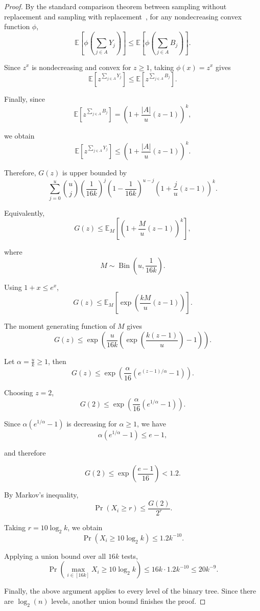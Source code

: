 \documentclass{article}
\begin{document}
\begin{proof}
By the standard comparison theorem between sampling without replacement and
sampling with replacement~\cite{hoeffding1963probability}, 
for any nondecreasing convex function $\phi$,
\[
\mathbb{E}\left[\phi\left(\sum_{j\in A}Y_j\right)\right]
\leq
\mathbb{E}\left[\phi\left(\sum_{j\in A}B_j\right)\right].
\]

Since $z^x$ is nondecreasing and convex for $z\geq 1$, taking
$\phi(x)=z^x$ gives
\[
\mathbb{E}
\left[
z^{\sum_{j\in A}Y_j}
\right]
\leq
\mathbb{E}
\left[
z^{\sum_{j\in A}B_j}
\right].
\]

Finally, since
\[
\mathbb{E}
\left[
z^{\sum_{j\in A}B_j}
\right]
=
\left(
1+\frac{|A|}{u}(z-1)
\right)^k, 
\]

we obtain
\[
\mathbb{E}
\left[
z^{\sum_{j\in A}Y_j}
\right]
\leq
\left(
1+\frac{|A|}{u}(z-1)
\right)^k .
\]

Therefore, $G(z)$ is upper bounded by
\[
\sum_{j=0}^{u}
{u\choose j}
\left(\frac1{16k}\right)^j
\left(1-\frac1{16k}\right)^{u-j}
\left(
1+\frac{j}{u}(z-1)
\right)^k .
\]

Equivalently,
\[
G(z)
\leq
\mathbb{E}_{M}
\left[
\left(
1+\frac{M}{u}(z-1)
\right)^k
\right],
\]

where
\[
M\sim
\operatorname{Bin}
\left(u,\frac1{16k}\right).
\]

Using $1+x\leq e^x$,
\[
G(z)
\leq
\mathbb{E}_{M}
\left[
\exp
\left(
\frac{kM}{u}(z-1)
\right)
\right].
\]

The moment generating function of $M$ gives
\[
G(z)
\leq
\exp
\left(
\frac{u}{16k}
\left(
\exp\left(\frac{k(z-1)}{u}\right)-1
\right)
\right).
\]

Let $\alpha=\frac{u}{k}\geq1$, then
\[
G(z)
\leq
\exp
\left(
\frac{\alpha}{16}
\left(
e^{(z-1)/\alpha}-1
\right)
\right).
\]

Choosing $z=2$,
\[
G(2)
\leq
\exp
\left(
\frac{\alpha}{16}(e^{1/\alpha}-1)
\right).
\]

Since $\alpha(e^{1/\alpha}-1)$ is decreasing for $\alpha\geq1$, we have 
\[
\alpha(e^{1/\alpha}-1)\leq e-1,
\]

and therefore

\[
G(2)
\leq
\exp\left(\frac{e-1}{16}\right)
<1.2 .
\]

By Markov's inequality,
\[
\Pr(X_i\geq r)
\leq
\frac{G(2)}{2^r}.
\]

Taking $r=10\log_2k$, we obtain
\[
\Pr(X_i\geq10\log_2k)
\leq
1.2k^{-10}.
\]

Applying a union bound over all $16k$ tests,
\[
\Pr
\left(
\max_{i\in[16k]}X_i\geq10\log_2k
\right)
\leq
16k\cdot1.2k^{-10}
\leq
20k^{-9}.
\]

Finally, the above argument applies to every level of the binary tree. Since
there are $\log_2(n)$ levels, another union bound finishes the proof. 
\end{proof}
\end{document}

